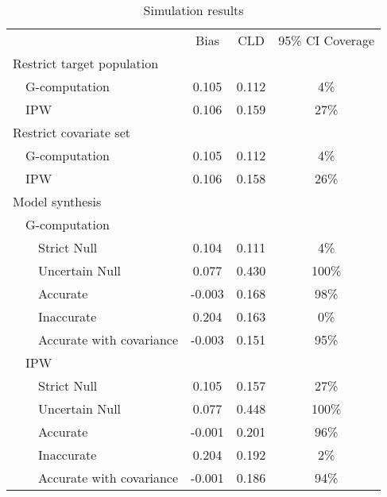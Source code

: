 \documentclass[]{article}
\begin{document}
\begin{table}[h]
	\caption{Simulation results}
	\centering
	\begin{tabular}{lllccc}
		\hline
		&       &                               & Bias   & CLD   & 95\% CI Coverage \\ \cline{4-6} 
		\multicolumn{3}{l}{Restrict target population} &        &       &                  \\
		& \multicolumn{2}{l}{G-computation}     & 0.105  & 0.112 & 4\%              \\
		& \multicolumn{2}{l}{IPW}               & 0.106  & 0.159 & 27\%             \\
		\multicolumn{3}{l}{Restrict covariate set}     &        &       &                  \\
		& \multicolumn{2}{l}{G-computation}     & 0.105  & 0.112 & 4\%              \\
		& \multicolumn{2}{l}{IPW}               & 0.106  & 0.158 & 26\%             \\
		\multicolumn{3}{l}{Model synthesis}            &        &       &                  \\
		& \multicolumn{2}{l}{G-computation}     &        &       &                  \\
		&       & Strict Null                   & 0.104  & 0.111 & 4\%              \\
		&       & Uncertain Null                & 0.077  & 0.430 & 100\%            \\
		&       & Accurate                      & -0.003 & 0.168 & 98\%             \\
		&       & Inaccurate                    & 0.204  & 0.163 & 0\%              \\
		&       & Accurate with covariance      & -0.003 & 0.151 & 95\%             \\
		& \multicolumn{2}{l}{IPW}               &        &       &                  \\
		&       & Strict Null                   & 0.105  & 0.157 & 27\%             \\
		&       & Uncertain Null                & 0.077  & 0.448 & 100\%            \\
		&       & Accurate                      & -0.001 & 0.201 & 96\%             \\
		&       & Inaccurate                    & 0.204  & 0.192 & 2\%              \\
		&       & Accurate with covariance      & -0.001 & 0.186 & 94\%             \\ \hline
	\end{tabular}
	\label{atab1}
\end{table}
\end{document}
